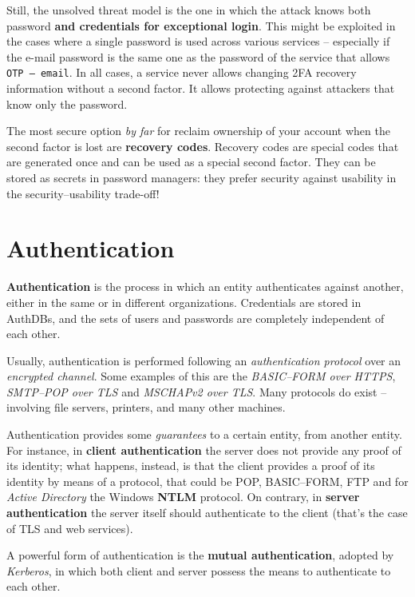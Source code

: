 \documentclass[10pt]{extbook}
\begin{document}
Still, the unsolved threat model is the one in which the attack knows both
password \textbf{and credentials for exceptional login}. This might be
exploited in the cases where a single password is used across various services
-- especially if the e\--mail password is the same one as the password of the
service that allows \texttt{OTP -- email}. In all cases, a service never allows
changing 2FA recovery information without a second factor. It allows protecting
against attackers that know only the password.

The most secure option \emph{by far} for reclaim ownership of your account when
the second factor is lost are \textbf{recovery codes}. Recovery codes are
special codes that are generated once and can be used as a special second
factor. They can be stored as secrets in password managers: they prefer
security against usability in the security\---usability trade\--off!


\chapter{Authentication}

\textbf{Authentication} is the process in which an entity authenticates against
another, either in the same or in different organizations. Credentials are
stored in AuthDBs, and the sets of users and passwords are completely
independent of each other.

Usually, authentication is performed following an \emph{authentication
protocol} over an \emph{encrypted channel}. Some examples of this are the
\emph{BASIC\---FORM over HTTPS}, \emph{SMTP\---POP over TLS} and \emph{MSCHAPv2
over TLS}. Many protocols do exist -- involving file servers, printers, and
many other machines.

Authentication provides some \emph{guarantees} to a certain entity, from
another entity. For instance, in \textbf{client authentication} the server does
not provide any proof of its identity; what happens, instead, is that the
client provides a proof of its identity by means of a protocol, that could be
POP, BASIC\---FORM, FTP and for \emph{Active Directory} the Windows
\textbf{NTLM} protocol. On contrary, in \textbf{server authentication} the
server itself should authenticate to the client (that's the case of TLS and web
services).

A powerful form of authentication is the \textbf{mutual authentication},
adopted by \emph{Kerberos}, in which both client and server possess the means
to authenticate to each other.
\end{document}
